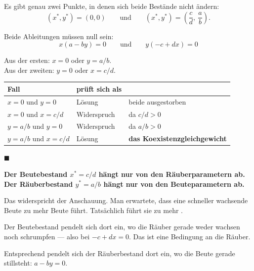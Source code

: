 \begin{merksatz}
Es gibt genau zwei Punkte, in denen sich beide Bestände nicht ändern:
\[ (x^{*}, y^{*}) = (0,0) \qquad\text{und}\qquad (x^{*}, y^{*}) = \left(\frac{c}{d},\ \frac{a}{b}\right) . \]

Beide Ableitungen müssen null sein:
\[ x(a-by) = 0 \qquad\text{und}\qquad y(-c+dx) = 0 \]

Aus der ersten: $x = 0$ oder $y = a/b$.\\
Aus der zweiten: $y = 0$ oder $x = c/d$.

\begin{center}
\renewcommand{\arraystretch}{1.48}
\begin{tabular}{@{}P{2.6cm}P{2.6cm}P{2.6cm}@{}}
\toprule
\textbf{Fall} & \textbf{prüft sich als} & \\
\midrule
$x=0$ und $y=0$ & \textcolor{gruen}{Lösung} & beide ausgestorben\\
$x=0$ und $x=c/d$ & \textcolor{akzent}{Widerspruch} & da $c/d > 0$\\
$y=a/b$ und $y=0$ & \textcolor{akzent}{Widerspruch} & da $a/b > 0$\\
$y=a/b$ und $x=c/d$ & \textcolor{gruen}{Lösung} & \textbf{das Koexistenzgleichgewicht}\\
\bottomrule
\end{tabular}
\end{center}
$\blacksquare$
\end{merksatz}

\begin{warnung}
\begin{center}
\begin{minipage}{0.9\textwidth}
\textbf{Der Beutebestand $x^{*} = c/d$ hängt nur von den Räuberparametern ab. Der Räuberbestand $y^{*} = a/b$ hängt nur von den Beuteparametern ab.}
\end{minipage}
\end{center}

Das widerspricht der Anschauung. Man erwartete, dass eine schneller wachsende Beute zu mehr Beute führt. Tatsächlich führt sie zu mehr .

Der Beutebestand pendelt sich dort ein, wo die Räuber gerade weder wachsen noch schrumpfen --- also bei $-c+dx = 0$. Das ist eine Bedingung an die Räuber.

Entsprechend pendelt sich der Räuberbestand dort ein, wo die Beute gerade stillsteht: $a - by = 0$.

\begin{center}
\begin{minipage}{0.88\textwidth}
\end{minipage}
\end{center}
\end{warnung}

